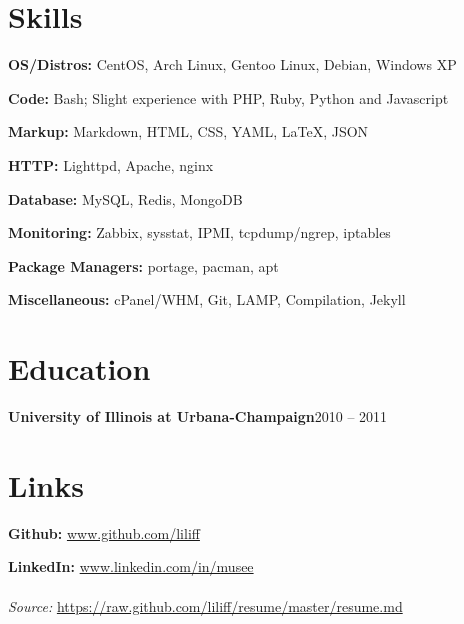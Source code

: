 \documentclass{article}
\newenvironment{entity}[2]{%
    \textbf{#1}\hfill #2\par
}{
    \vspace{0.1em}%
    \par%
}
\begin{document}
\section{Skills}

\textbf{OS/Distros:} CentOS, Arch Linux, Gentoo Linux, Debian, Windows XP\par
\textbf{Code:} Bash; Slight experience with PHP, Ruby, Python and Javascript\par
\textbf{Markup:} Markdown, HTML, CSS, YAML, \LaTeX, JSON\par
\textbf{HTTP:} Lighttpd, Apache, nginx\par
\textbf{Database:} MySQL, Redis, MongoDB\par
\textbf{Monitoring:} Zabbix, sysstat, IPMI, tcpdump/ngrep, iptables\par
\textbf{Package Managers:} portage, pacman, apt\par
\textbf{Miscellaneous:} cPanel/WHM, Git, LAMP, Compilation, Jekyll
\section{Education}

    \begin{entity}{University of Illinois at Urbana-Champaign}{2010 -- 2011}


    \end{entity}
\section{Links}

\textbf{Github:} \url{www.github.com/liliff}\par
\textbf{LinkedIn:} \url{www.linkedin.com/in/musee}
\\
\\
\textsl{Source:} \url{https://raw.github.com/liliff/resume/master/resume.md}
\end{document}
